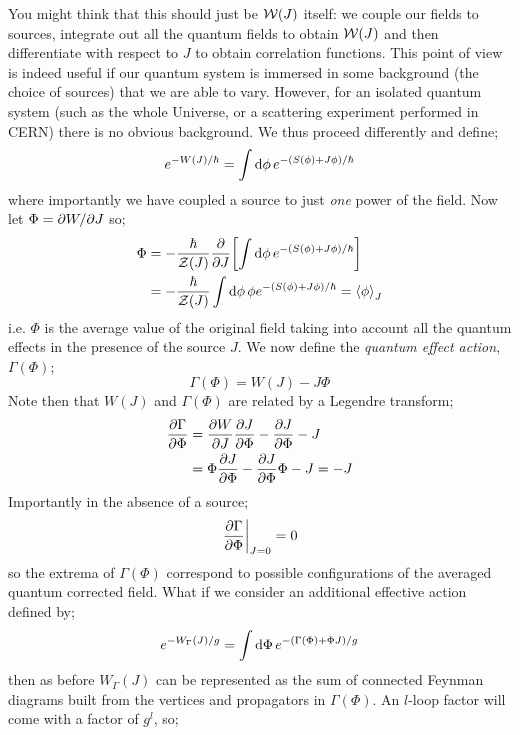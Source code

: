 \paraskip
You might think that this should just be $\mathcal{W}(J)$ itself: we couple our fields to sources, integrate out all the quantum fields to obtain $\mathcal{W}(J)$ and then differentiate with respect to $J$ to obtain correlation functions. This point of view is indeed useful if our quantum system is immersed in some background (the choice of sources) that we are able to vary. However, for an isolated quantum system (such as the whole Universe, or a scattering experiment performed in CERN) there is no obvious background. We thus proceed differently and define;
\begin{equation}
e^{-W(J)/\hbar} = \int{\upd{\phi}e^{-\left(S(\phi) + J\phi\right)/\hbar}}
\end{equation}
where importantly we have coupled a source to just \emph{one} power of the field. Now let $\Phi = \partial W/ \partial J$ so;
\begin{align*}
\Phi &= -\frac{\hbar}{\mZ(J)}\frac{\del}{\del J}\left[\int{\upd{\phi}e^{-\left(S(\phi) + J\phi\right)/\hbar}}\right] \\
&= -\frac{\hbar}{\mZ(J)}\int{\upd{\phi}\phi e^{-\left(S(\phi) + J\phi\right)/\hbar}} = \left< \phi \right>_J
\end{align*}
i.e. $\Phi$ is the average value of the original field taking into account all the quantum effects in the presence of the source $J$. We now define the \emph{quantum effect action}, $\Gamma(\Phi)$;
\begin{equation}
\Gamma(\Phi) = W(J) - J\Phi
\end{equation}
Note then that $W(J)$ and $\Gamma(\Phi)$ are related by a Legendre transform;
\begin{align*}
\frac{\partial \Gamma}{\partial \Phi} &= \frac{\partial W}{\partial J}\frac{\partial J}{\partial \Phi} - \frac{\partial J}{\partial \Phi} - J \\
&= \Phi\frac{\partial J}{\partial \Phi} - \frac{\partial J}{\partial \Phi}\Phi - J = -J
\end{align*}
Importantly in the absence of a source;
\begin{equation*}
\left.\frac{\del \Gamma}{\del \Phi}\right|_{J = 0} = 0
\end{equation*}
so the extrema of $\Gamma(\Phi)$ correspond to possible configurations of the averaged quantum corrected field. What if we consider an additional effective action defined by;
\begin{equation*}
e^{-W_{\Gamma}(J)/g} = \int{\upd{\Phi}e^{-\left(\Gamma(\Phi) + \Phi J\right)/g}}
\end{equation*}
then as before $W_{\Gamma}(J)$ can be represented as the sum of connected Feynman diagrams built from the vertices and propagators in $\Gamma(\Phi)$. An $l$-loop factor will come with a factor of $g^{l}$, so;
